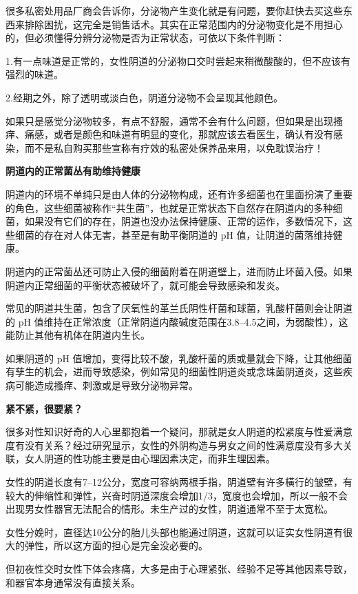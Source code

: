 \documentclass[12pt,UTF8]{ctexbook}
\begin{document}
很多私密处用品厂商会告诉你，分泌物产生变化就是有问题，要你赶快去买这些东西来排除困扰，这完全是销售话术。其实在正常范围内的分泌物变化是不用担心的，但必须懂得分辨分泌物是否为正常状态，可依以下条件判断：

1.有一点味道是正常的，女性阴道的分泌物口交时尝起来稍微酸酸的，但不应该有强烈的味道。

2.经期之外，除了透明或淡白色，阴道分泌物不会呈现其他颜色。

如果只是感觉分泌物较多，有点不舒服，通常不会有什么问题，但如果是出现搔痒、痛感，或者是颜色和味道有明显的变化，那就应该去看医生，确认有没有感染，而不是私自购买那些宣称有疗效的私密处保养品来用，以免耽误治疗！

\textbf{阴道内的正常菌丛有助维持健康}

阴道内的环境不单纯只是由人体的分泌物构成，还有许多细菌也在里面扮演了重要的角色，这些细菌被称作“共生菌”，也就是正常状态下自然存在阴道内的多种细菌，如果没有它们的存在，阴道也没办法保持健康、正常的运作，多数情况下，这些细菌的存在对人体无害，甚至是有助平衡阴道的 pH 值，让阴道的菌落维持健康。

阴道内的正常菌丛还可防止入侵的细菌附着在阴道壁上，进而防止坏菌入侵。如果阴道内正常细菌的平衡状态被破坏了，就可能会导致感染和发炎。

常见的阴道共生菌，包含了厌氧性的革兰氏阴性杆菌和球菌，乳酸杆菌则会让阴道的 pH 值维持在正常浓度（正常阴道内酸碱度范围在3.8--4.5之间，为弱酸性），这能防止其他有机体在阴道内生长。

如果阴道的 pH 值增加，变得比较不酸，乳酸杆菌的质或量就会下降，让其他细菌有孳生的机会，进而导致感染，例如常见的细菌性阴道炎或念珠菌阴道炎，这些疾病可能造成搔痒、刺激或是导致分泌物异常。

\textbf{紧不紧，很要紧？}

很多对性知识好奇的人心里都抱着一个疑问，那就是女人阴道的松紧度与性爱满意度有没有关系？经过研究显示，女性的外阴构造与男女之间的性满意度没有多大关联，女人阴道的性功能主要是由心理因素决定，而非生理因素。

女性的阴道长度有7--12公分，宽度可容纳两根手指，阴道壁有许多橫行的皱壁，有较大的伸缩性和弹性，兴奋时阴道深度会增加1/3，宽度也会增加，所以一般不会出现男女性器官无法配合的情形。未生产过的女性，阴道通常不至于太宽松。

女性分娩时，直径达10公分的胎儿头部也能通过阴道，这就可以证实女性阴道有很大的弹性，所以这方面的担心是完全没必要的。

但初夜性交时女性下体会疼痛，大多是由于心理紧张、经验不足等其他因素导致，和器官本身通常没有直接关系。
\end{document}
